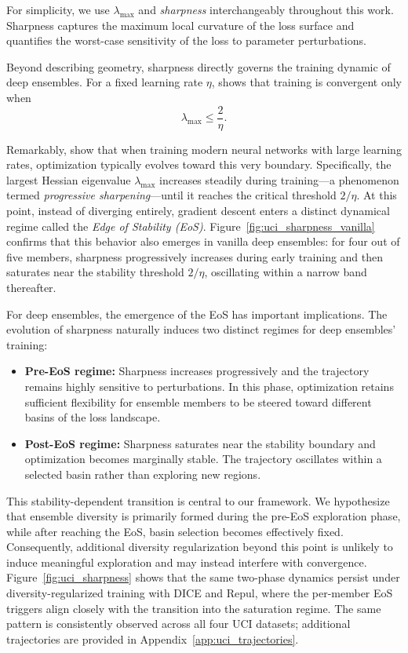 \documentclass[sigconf]{acmart}
\begin{document}
For simplicity, we use $\lambda_{\max}$ and \emph{sharpness} interchangeably throughout this work. Sharpness captures the maximum local curvature of the loss surface and quantifies the worst-case sensitivity of the loss to parameter perturbations.


Beyond describing geometry, sharpness directly governs the training dynamic of deep ensembles.
For a fixed learning rate $\eta$, \citet{wu2018sgdselect} shows that training is convergent only when
\begin{equation}
\lambda_{\max} \le \frac{2}{\eta}.
\label{eq:stability_bound}
\end{equation}

Remarkably, \citet{cohen2021gradient} show that when training modern
neural networks with large learning rates,
optimization typically evolves toward this very boundary.
Specifically, the largest Hessian eigenvalue $\lambda_{\max}$
increases steadily during training—a phenomenon termed
\emph{progressive sharpening}—until it reaches the critical
threshold $2/\eta$.
At this point, instead of diverging entirely, gradient descent
enters a distinct dynamical regime called the
\emph{Edge of Stability (EoS)}.
Figure~\ref{fig:uci_sharpness_vanilla} confirms that this behavior also emerges in vanilla deep ensembles:
for four out of five members, sharpness progressively increases during early training and then saturates near the stability threshold $2/\eta$, oscillating within a narrow band thereafter.

For deep ensembles, the emergence of the EoS has important implications.
The evolution of sharpness naturally induces two distinct regimes for deep ensembles' training:

\begin{itemize}
    \item \textbf{Pre-EoS regime:} Sharpness increases progressively and the trajectory
    remains highly sensitive to perturbations. In this phase, optimization
    retains sufficient flexibility for ensemble members to be steered toward
    different basins of the loss landscape.

    \item \textbf{Post-EoS regime:} Sharpness saturates near the stability boundary
    and optimization becomes marginally stable. The trajectory oscillates within
    a selected basin rather than exploring new regions.
\end{itemize}

This stability-dependent transition is central to our framework.
We hypothesize that ensemble diversity is primarily formed during the
pre-EoS exploration phase, while after reaching the EoS,
basin selection becomes effectively fixed.
Consequently, additional diversity regularization beyond this point
is unlikely to induce meaningful exploration and may instead
interfere with convergence.
Figure~\ref{fig:uci_sharpness} shows that the same two-phase dynamics persist under diversity-regularized training with DICE and Repul, where the per-member EoS triggers align closely with the transition into the saturation regime.
The same pattern is consistently observed across all four UCI datasets; additional trajectories are provided in Appendix~\ref{app:uci_trajectories}.
\end{document}
